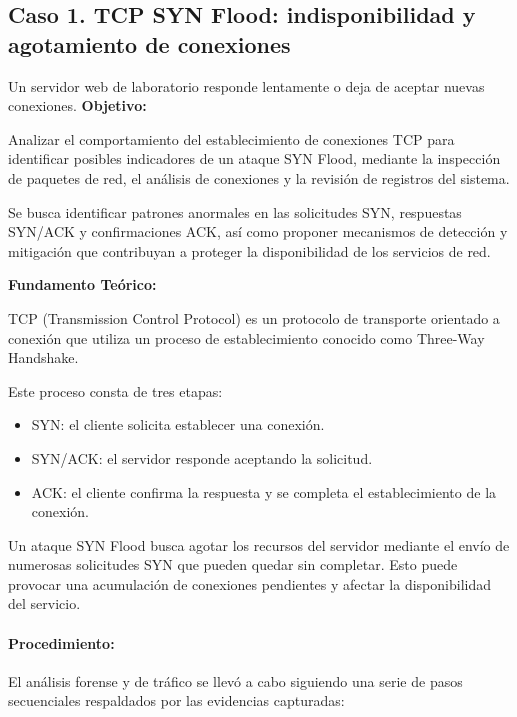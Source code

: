 \subsection{Caso 1. TCP SYN Flood: indisponibilidad y agotamiento de conexiones}
\label{caso:syn-flood}

\begin{situacion}
Un servidor web de laboratorio responde lentamente o deja de aceptar nuevas conexiones.
\textbf{Objetivo:} \par
Analizar el comportamiento del establecimiento de conexiones TCP para identificar posibles indicadores de un ataque SYN Flood, mediante la inspección de paquetes de red, el análisis de conexiones y la revisión de registros del sistema.

Se busca identificar patrones anormales en las solicitudes SYN, respuestas SYN/ACK y confirmaciones ACK, así como proponer mecanismos de detección y mitigación que contribuyan a proteger la disponibilidad de los servicios de red. \par
\textbf{Fundamento Teórico:} \par
TCP (Transmission Control Protocol) es un protocolo de transporte orientado a conexión que utiliza un proceso de establecimiento conocido como Three-Way Handshake.\par
Este proceso consta de tres etapas:
\begin{itemize}
	\item SYN: el cliente solicita establecer una conexión.
	\item SYN/ACK: el servidor responde aceptando la solicitud.
	\item ACK: el cliente confirma la respuesta y se completa el establecimiento de la conexión.
\end{itemize}
Un ataque SYN Flood busca agotar los recursos del servidor mediante el envío de numerosas solicitudes SYN que pueden quedar sin completar. Esto puede provocar una acumulación de conexiones pendientes y afectar la disponibilidad del servicio.
\end{situacion}

\paragraph{Procedimiento:} 
El análisis forense y de tráfico se llevó a cabo siguiendo una serie de pasos secuenciales respaldados por las evidencias capturadas:

